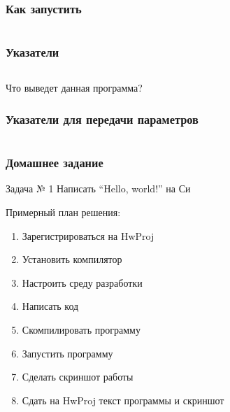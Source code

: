 \documentclass[aspectratio=169]{beamer}
\begin{document}
\begin{frame}
    \frametitle{Как запустить}

    \inputminted{console}{01_basic_c_trace.txt}

\end{frame}

\begin{frame}
    \frametitle{Указатели}

    \inputminted{c}{01_pointers_question.c}

    \vspace{1em}

    \alert{Что выведет данная программа?}

\end{frame}

\begin{frame}
    \frametitle{Указатели для передачи параметров}

    \inputminted[fontsize=\small]{c}{01_pointers_basic.c}

\end{frame}

\begin{frame}
    \frametitle{Домашнее задание}

    \begin{block}{Задача № 1}
        Написать \enquote{Hello, world!} на Си
    \end{block}

    Примерный план решения:
    \begin{enumerate}
        \item Зарегистрироваться на HwProj
        \item Установить компилятор
        \item Настроить среду разработки
        \item Написать код
        \item Скомпилировать программу
        \item Запустить программу
        \item Сделать скриншот работы
        \item Сдать на HwProj текст программы и скриншот
    \end{enumerate}

\end{frame}
\end{document}
